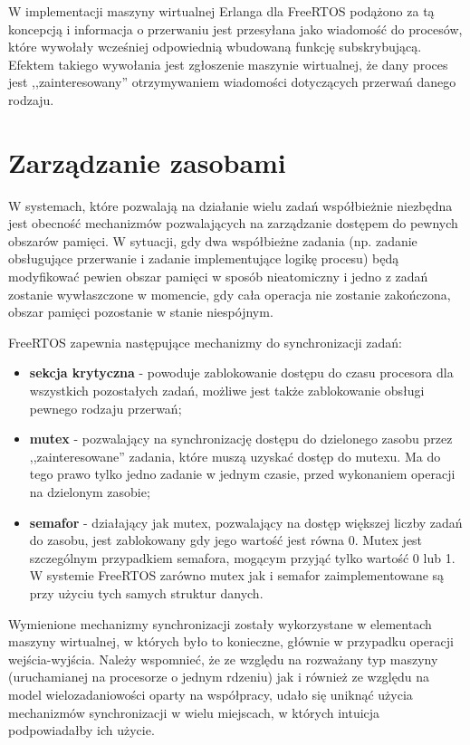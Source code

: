 W implementacji maszyny wirtualnej Erlanga dla FreeRTOS podążono za tą koncepcją i informacja o przerwaniu jest przesyłana jako wiadomość do procesów, które wywołały wcześniej odpowiednią wbudowaną funkcję subskrybującą. Efektem takiego wywołania jest zgłoszenie maszynie wirtualnej, że dany proces jest ,,zainteresowany'' otrzymywaniem wiadomości dotyczących przerwań danego rodzaju. 

\section{Zarządzanie zasobami}
\label{sec:rtosZasoby}

W systemach, które pozwalają na działanie wielu zadań współbieżnie niezbędna jest obecność mechanizmów pozwalających na 
zarządzanie dostępem do pewnych obszarów pamięci. W sytuacji, gdy dwa współbieżne zadania (np. zadanie obsługujące przerwanie i 
zadanie implementujące logikę procesu) będą modyfikować pewien obszar pamięci w sposób nieatomiczny i jedno z zadań zostanie wywłaszczone w momencie, gdy cała operacja nie zostanie zakończona, obszar pamięci pozostanie w stanie niespójnym.

FreeRTOS zapewnia następujące mechanizmy do synchronizacji zadań:
\begin{itemize}
\item \textbf{sekcja krytyczna} - powoduje zablokowanie dostępu do czasu procesora dla wszystkich pozostałych zadań, możliwe jest także zablokowanie obsługi pewnego rodzaju przerwań;
\item \textbf{mutex} - pozwalający na synchronizację dostępu do dzielonego zasobu przez ,,zainteresowane'' zadania, które muszą uzyskać dostęp do mutexu. Ma do tego prawo tylko jedno zadanie w jednym czasie, przed wykonaniem operacji na dzielonym zasobie;
\item \textbf{semafor} - działający jak mutex, pozwalający na dostęp większej liczby zadań do zasobu, jest zablokowany gdy jego wartość jest równa 0. Mutex jest szczególnym przypadkiem semafora, mogącym przyjąć tylko wartość 0 lub 1. W systemie FreeRTOS zarówno mutex jak i semafor zaimplementowane są przy użyciu tych samych struktur danych.
\end{itemize}

Wymienione mechanizmy synchronizacji zostały wykorzystane w elementach maszyny wirtualnej, w których było to konieczne, głównie w przypadku operacji wejścia-wyjścia.
Należy wspomnieć, że ze względu na rozważany typ maszyny (uruchamianej na procesorze o jednym rdzeniu) jak i również ze względu na model wielozadaniowości oparty na współpracy, udało się uniknąć użycia mechanizmów synchronizacji w wielu miejscach, w których intuicja podpowiadałby ich użycie.

